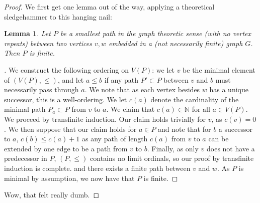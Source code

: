 \documentclass[english]{article}
\newcommand{\NN}{\mathbb{N}}
\newenvironment{subproof}[1][\proofname]{%
	\renewcommand{\qedsymbol}{$\blacksquare$}%
	\begin{proof}[#1]%
	}{%
	\end{proof}%
}
\newtheorem{lemma}[theorem]{Lemma}
\theoremstyle{remark}
\theoremstyle{definition}
\begin{document}
\begin{proof}
We first get one lemma out of the way, applying a theoretical sledgehammer to this hanging nail:
\begin{lemma}
Let $P$ be a smallest path in the graph theoretic sense (with no vertex repeats) between two vertices $v,w$ embedded in a (not necessarily finite) graph $G$. Then $P$ is finite.
\end{lemma}	
\begin{subproof}
	We construct the following ordering on $V(P)$: we let $v$ be the minimal element of $(V(P),\leq)$, and let $a\leq b$ if any path $P'\subset P$ between $v$ and $b$ must necessarily pass through $a$. We note that as each vertex besides $w$ has a unique successor, this is a well-ordering. We let $c(a)$ denote the cardinality of the minimal path $P_a\subset P$ from $v$ to $a$. We claim that $c(a)\in \NN$ for all $a\in V(P)$. We proceed by transfinite induction. Our claim holds trivially for $v$, as $c(v)=0$. We then suppose that our claim holds for $a\in P$ and note that for $b$ a successor to $a$, $c(b)\leq c(a)+1$ as any path of length $c(a)$ from $v$ to $a$ can be extended by one edge to be a path from $v$ to $b$. Finally, as only $v$ does not have a predecessor in $P$, $(P,\leq)$ contains no limit ordinals, so our proof by transfinite induction is complete. and there exists a finite path between $v$ and $w$. As $P$ is minimal by assumption, we now have that $P$ is finite.
\end{subproof}
Wow, that felt really dumb.


\end{proof}
\end{document}
